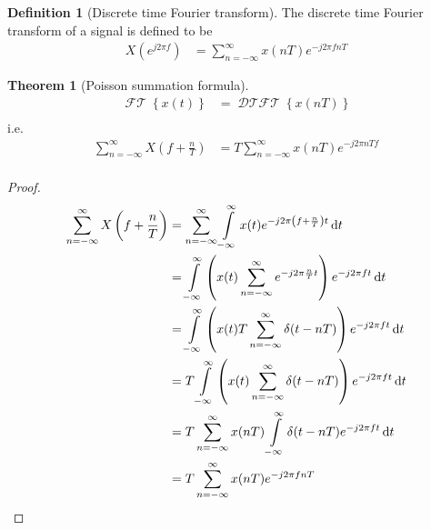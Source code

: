\documentclass[titlepage, fleqn, a4paper, 12pt, twoside]{article}
\theoremstyle{definition}
\newtheorem{definition}{Definition}
\theoremstyle{theorem}
\newtheorem{theorem}{Theorem}
\DeclareMathOperator{\FT}{\mathcal{FT}}
\DeclareMathOperator{\DTFT}{\mathcal{DTFT}}
\begin{document}
\begin{definition}[Discrete time Fourier transform]
	The discrete time Fourier transform of a signal is defined to be
	\begin{align*}
		X\left( e^{j 2 \pi f} \right) &= \sum\limits_{n = -\infty}^{\infty} x(n T) e^{-j 2 \pi f n T}
	\end{align*}
\end{definition}

\begin{theorem}[Poisson summation formula]
	\begin{align*}
		\FT\left\{ x(t) \right\} &= \DTFT\left\{ x(n T) \right\}\\
	\end{align*}
	i.e.
	\begin{align*}
		\sum\limits_{n = -\infty}^{\infty} X\left( f + \frac{n}{T} \right) &= T \sum\limits_{n = -\infty}^{\infty} x(n T) e^{-j 2 \pi n T f}\\
	\end{align*}
	\label{thm:Poisson_summation_formula}
\end{theorem}

\begin{proof}
	\begin{align*}
		\sum\limits_{n = -\infty}^{\infty} X\left( f + \frac{n}{T} \right) &= \sum\limits_{n = -\infty}^{\infty} \int\limits_{-\infty}^{\infty} x(t) e^{-j 2 \pi \left( f + \frac{n}{T} \right) t} \dif t\\
		&= \int\limits_{-\infty}^{\infty} \left( x(t) \sum\limits_{n = -\infty}^{\infty} e^{-j 2 \pi \frac{n}{T} t} \right) e^{-j 2 \pi f t} \dif t\\
		&= \int\limits_{-\infty}^{\infty} \left( x(t) T \sum\limits_{n = -\infty}^{\infty} \delta(t - n T) \right) e^{-j 2 \pi f t} \dif t\\
		&= T \int\limits_{-\infty}^{\infty} \left( x(t) \sum\limits_{n = -\infty}^{\infty} \delta(t - n T) \right) e^{-j 2 \pi f t} \dif t\\
		&= T \sum\limits_{n = -\infty}^{\infty} x(n T) \int\limits_{-\infty}^{\infty} \delta(t - n T) e^{-j 2 \pi f t} \dif t\\
		&= T \sum\limits_{n = -\infty}^{\infty} x(n T) e^{-j 2 \pi f n T}
	\end{align*}
\end{proof}
\end{document}
